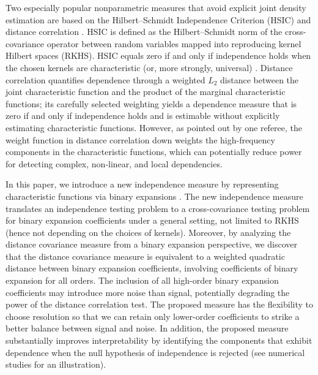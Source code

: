 \documentclass[12pt,reqno,oneside]{amsbook}
\theoremstyle{definition}
\theoremstyle{remark}
\begin{document}
Two especially popular nonparametric measures that avoid explicit joint density estimation are based on the Hilbert--Schmidt Independence Criterion (HSIC) \cite{Gretton2008} and distance correlation \cite{Szekely2007,Sejdinovic_2013}. HSIC \cite{Gretton2008} is defined as the Hilbert--Schmidt norm of the cross-covariance operator between random variables mapped into reproducing kernel Hilbert spaces (RKHS). HSIC equals zero if and only if independence holds when the chosen kernels are characteristic (or, more strongly, universal) \cite{Gretton2005HSIC,Sriperumbudur2011Characteristic,Steinwart2012Universal}. Distance correlation \cite{Szekely2007,Sejdinovic_2013} quantifies dependence through a weighted $L_2$ distance between the joint characteristic function and the product of the marginal characteristic functions; its carefully selected weighting yields a dependence measure that is zero if and only if independence holds and is estimable without explicitly estimating characteristic functions. However, as pointed out by one referee, the weight function in distance correlation down weights the high-frequency components in the characteristic functions, which can potentially reduce power for detecting complex, non-linear, and local dependencies.

In this paper, we introduce a new independence measure by representing characteristic functions via binary expansions \cite{zhang2019bet,zhang2021beauty,brown2025belief}. The new independence measure translates an independence testing problem to a cross-covariance testing problem for binary expansion coefficients under a general setting, not limited to RKHS (hence not depending on the choices of kernels). Moreover, by analyzing the distance covariance measure \cite{Szekely2007} from a binary expansion perspective, we discover that the distance covariance measure is equivalent to a weighted quadratic distance between binary expansion coefficients, involving coefficients of binary expansion for all orders. The inclusion of all high-order binary expansion coefficients may introduce more noise than signal, potentially degrading the power of the distance correlation test. The proposed measure has the flexibility to choose resolution so that we can retain only lower-order coefficients to strike a better balance between signal and noise. In addition, the proposed measure substantially improves interpretability by identifying the components that exhibit dependence when the null hypothesis of independence is rejected (see numerical studies for 
an illustration).
\end{document}
